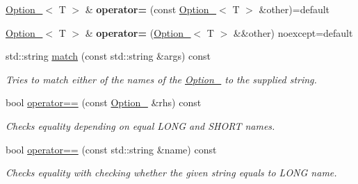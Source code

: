 \begin{DoxyCompactItemize}
    \item
    \mbox{\label{class_info_parse_1_1_option___a1b2c4badf391b91793c2f8d8fe3c576c}}
    \mbox{\hyperlink{class_info_parse_1_1_option__}{Option\+\_\+}}$<$ T $>$ \& {\bfseries operator=} (const \mbox{\hyperlink{class_info_parse_1_1_option__}{Option\+\_\+}}$<$ T $>$ \&other)=default
    \item
    \mbox{\label{class_info_parse_1_1_option___a0dc5118939f5746bfcd2146bc522dda4}}
    \mbox{\hyperlink{class_info_parse_1_1_option__}{Option\+\_\+}}$<$ T $>$ \& {\bfseries operator=} (\mbox{\hyperlink{class_info_parse_1_1_option__}{Option\+\_\+}}$<$ T $>$ \&\&other) noexcept=default
    \item
    std\+::string \mbox{\hyperlink{class_info_parse_1_1_option___a3fc88712223eb85ad1bb16c89eb0f49a}{match}} (const std\+::string \&args) const
    \begin{DoxyCompactList}
        \small\item\em Tries to match either of the names of the \mbox{\hyperlink{class_info_parse_1_1_option__}{Option\+\_\+}} to the supplied string.
    \end{DoxyCompactList}\item
    bool \mbox{\hyperlink{class_info_parse_1_1_option___a49e2c6e87075ba1c1c75518317400e76}{operator==}} (const \mbox{\hyperlink{class_info_parse_1_1_option__}{Option\+\_\+}} \&rhs) const
    \begin{DoxyCompactList}
        \small\item\em Checks equality depending on equal L\+O\+NG and S\+H\+O\+RT names.
    \end{DoxyCompactList}\item
    \mbox{\label{class_info_parse_1_1_option___aede68596b414cca93e8eed031285d517}}
    bool \mbox{\hyperlink{class_info_parse_1_1_option___aede68596b414cca93e8eed031285d517}{operator==}} (const std\+::string \&name) const
    \begin{DoxyCompactList}
        \small\item\em Checks equality with checking whether the given string equals to L\+O\+NG name.
    \end{DoxyCompactList}\item
    \mbox{\label{class_info_parse_1_1_option___a6a69c8e4d4bda3e88b2f5abbaa6dc80c}}

\end{DoxyCompactItemize}
